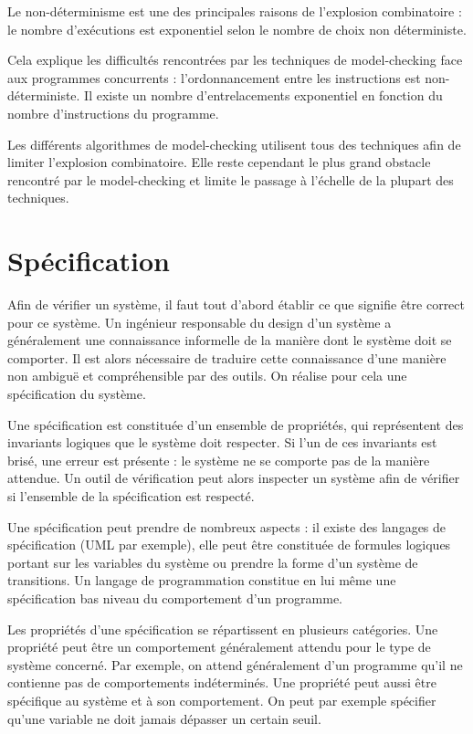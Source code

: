 Le non-déterminisme est une des principales raisons de l'explosion combinatoire :
le nombre d'exécutions est exponentiel selon le nombre de choix non déterministe.

Cela explique les difficultés rencontrées par les techniques de model-checking
face aux programmes concurrents : l'ordonnancement entre les instructions est
non-déterministe. Il existe un nombre d'entrelacements exponentiel en fonction
du nombre d'instructions du programme.

Les différents algorithmes de model-checking utilisent tous des
techniques afin de limiter l'explosion combinatoire. Elle reste
cependant le plus grand obstacle rencontré par le model-checking et
limite le passage à l'échelle de la plupart des techniques.

\section{Spécification}\label{sec:specification}

Afin de vérifier un système, il faut tout d'abord établir ce que signifie être
correct pour ce système. Un ingénieur responsable du design d'un système a
généralement une connaissance informelle de la manière dont le système doit se
comporter. Il est alors nécessaire de traduire cette connaissance d'une manière
non ambiguë et compréhensible par des outils. On réalise pour cela une
spécification du système.

Une spécification est constituée d'un ensemble de propriétés, qui représentent
des invariants logiques que le système doit respecter. Si l'un de ces invariants
est brisé, une erreur est présente : le système ne se comporte pas de la manière
attendue. Un outil de vérification peut alors inspecter un système afin de
vérifier si l'ensemble de la spécification est respecté.

Une spécification peut prendre de nombreux aspects : il existe des langages de
spécification (UML par exemple), elle peut être constituée de formules logiques
portant sur les variables du système ou prendre la forme d'un système de
transitions. Un langage de programmation constitue en lui même une spécification
bas niveau du comportement d'un programme.

Les propriétés d'une spécification se répartissent en plusieurs catégories. Une
propriété peut être un comportement généralement attendu pour le type de système
concerné. Par exemple, on attend généralement d'un programme qu'il ne contienne
pas de comportements indéterminés. Une propriété peut aussi être spécifique au
système et à son comportement. On peut par exemple spécifier qu'une variable ne
doit jamais dépasser un certain seuil.


